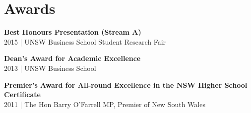 \section*{Awards}

\noindent\textbf{Best Honours Presentation (Stream A)}
\\ 2015 | UNSW Business School Student Research Fair

\vspace{20pt}

\noindent\textbf{Dean’s Award for Academic Excellence}
\\ 2013 | UNSW Business School

\vspace{20pt}

\noindent\textbf{Premier's Award for All-round Excellence in the NSW Higher School Certificate}
\\ 2011 | The Hon Barry O'Farrell MP, Premier of New South Wales